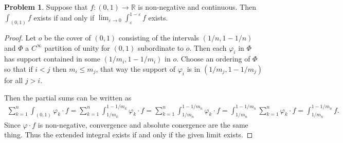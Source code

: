\documentclass[20pt]{article}
\theoremstyle{plain}
\theoremstyle{definition}
\newtheorem*{problem}{Problem}
\newcommand{\reals}{\mathbb{R}}
\begin{document}
\begin{problem}{3.37}
  Suppose that $f: (0, 1) \to \reals$ is non-negative and continuous.
  Then $\int_{(0,1)}f$ exists if and only if
  $\lim_{\varepsilon \to 0} \int_\varepsilon^{1-\varepsilon}f$ exists.
\end{problem}

\begin{proof}
  Let $o$ be the cover of $(0, 1)$ consisting of the intervals
  $(1/n, 1 - 1/n)$ and $\Phi$ a $C^\infty$ partition of unity for $(0, 1)$
  subordinate to $o$.
  Then each $\varphi_i$ in $\Phi$ has support contained in some
  $(1/m_i, 1 - 1/m_i)$ in $o$.
  Choose an ordering of $\Phi$ so that if $i < j$ then $m_i \leq m_j$, that way
  the support of $\varphi_i$ is in $ (1 / m_j, 1 - 1/m_j) $ for all $j > i.$

  Then the partial sums can be written as
  \begin{align*}
    \sum_{k=1}^n \int_{(0, 1)} \varphi_k \cdot f =
    \sum_{k=1}^n \int_{1/m_k}^{1 - 1/m_k} \varphi_k \cdot f =
    \sum_{k=1}^n \int_{1/m_n}^{1 - 1/m_n} \varphi_k \cdot f =
    \int_{1/m_n}^{1 - 1/m_n} \sum_{k=1}^n  \varphi_k \cdot f =
    \int_{1/m_n}^{1 - 1/m_n} f.
  \end{align*}
  Since $\varphi \cdot f$ is non-negative, convergence and absolute conergence
  are the same thing. Thus the extended integral exists if and only if the
  given limit exists.
\end{proof}
\end{document}
